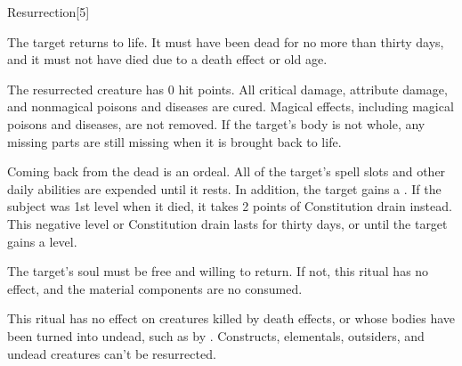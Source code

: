 \begin{spellsection}[Lesser]{Resurrection}[5]
    \begin{spellheader}
    \end{spellheader}
    \begin{spellcontent}
        \begin{spelltargetinginfo}
        \end{spelltargetinginfo}
        \begin{spelleffects}

            \spelleffect The target returns to life. It must have been dead for no more than thirty days, and it must not have died due to a death effect or old age.

            The resurrected creature has 0 hit points. All critical damage, attribute damage, and nonmagical poisons and diseases are cured. Magical effects, including magical poisons and diseases, are not removed. If the target's body is not whole, any missing parts are still missing when it is brought back to life.

            \par Coming back from the dead is an ordeal. All of the target's spell slots and other daily abilities are expended until it rests. In addition, the target gains a \negativelevel. If the subject was 1st level when it died, it takes 2 points of Constitution drain instead. This negative level or Constitution drain lasts for thirty days, or until the target gains a level.
        \end{spelleffects}
    \end{spellcontent}
    \begin{spellfooter}
        \spellnotes The target's soul must be free and willing to return. If not, this ritual has no effect, and the material components are no consumed.

        This ritual has no effect on creatures killed by death effects, or whose bodies have been turned into undead, such as by . Constructs, elementals, outsiders, and undead creatures can't be resurrected.
    \end{spellfooter}
\end{spellsection}

